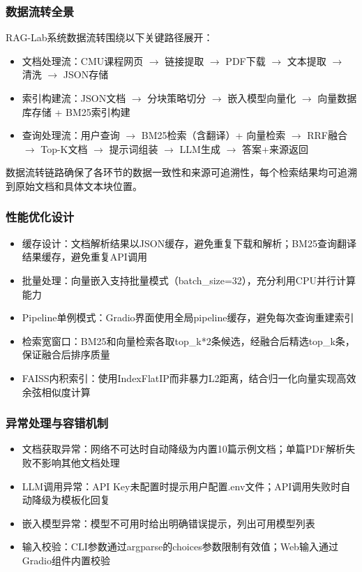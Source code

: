 \documentclass[10pt,a4paper]{article}
\begin{document}
\subsubsection{数据流转全景}

RAG-Lab系统数据流转围绕以下关键路径展开：
\begin{itemize}
\item 文档处理流：CMU课程网页 $\to$ 链接提取 $\to$ PDF下载 $\to$ 文本提取 $\to$ 清洗 $\to$ JSON存储
\item 索引构建流：JSON文档 $\to$ 分块策略切分 $\to$ 嵌入模型向量化 $\to$ 向量数据库存储 + BM25索引构建
\item 查询处理流：用户查询 $\to$ BM25检索（含翻译）+ 向量检索 $\to$ RRF融合 $\to$ Top-K文档 $\to$ 提示词组装 $\to$ LLM生成 $\to$ 答案+来源返回
\end{itemize}

数据流转链路确保了各环节的数据一致性和来源可追溯性，每个检索结果均可追溯到原始文档和具体文本块位置。

\subsubsection{性能优化设计}
\begin{itemize}
\item 缓存设计：文档解析结果以JSON缓存，避免重复下载和解析；BM25查询翻译结果缓存，避免重复API调用
\item 批量处理：向量嵌入支持批量模式（batch\_size=32），充分利用CPU并行计算能力
\item Pipeline单例模式：Gradio界面使用全局pipeline缓存，避免每次查询重建索引
\item 检索宽窗口：BM25和向量检索各取top\_k*2条候选，经融合后精选top\_k条，保证融合后排序质量
\item FAISS内积索引：使用IndexFlatIP而非暴力L2距离，结合归一化向量实现高效余弦相似度计算
\end{itemize}

\subsubsection{异常处理与容错机制}
\begin{itemize}
\item 文档获取异常：网络不可达时自动降级为内置10篇示例文档；单篇PDF解析失败不影响其他文档处理
\item LLM调用异常：API Key未配置时提示用户配置.env文件；API调用失败时自动降级为模板化回复
\item 嵌入模型异常：模型不可用时给出明确错误提示，列出可用模型列表
\item 输入校验：CLI参数通过argparse的choices参数限制有效值；Web输入通过Gradio组件内置校验
\end{itemize}
\end{document}
